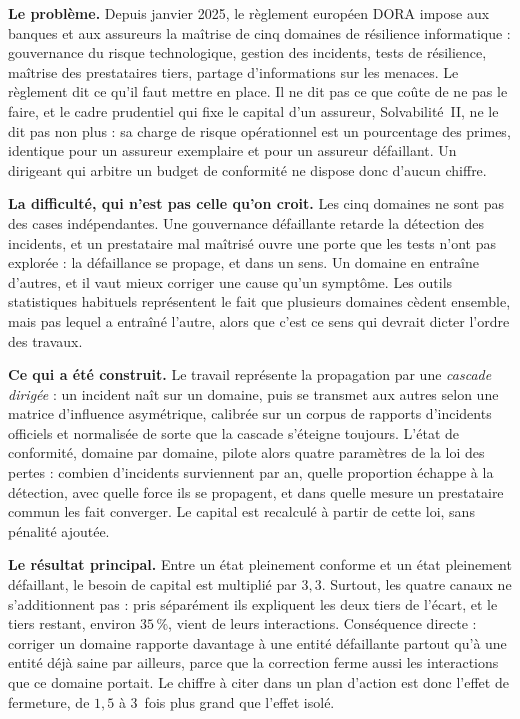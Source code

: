 \documentclass[12pt,a4paper]{article}
\theoremstyle{definition}
\begin{document}

\textbf{Le problème.} Depuis janvier 2025, le règlement européen DORA impose aux
banques et aux assureurs la maîtrise de cinq domaines de résilience informatique :
gouvernance du risque technologique, gestion des incidents, tests de résilience,
maîtrise des prestataires tiers, partage d'informations sur les menaces. Le
règlement dit ce qu'il faut mettre en place. Il ne dit pas ce que coûte de ne pas
le faire, et le cadre prudentiel qui fixe le capital d'un assureur,
Solvabilité~II, ne le dit pas non plus : sa charge de risque opérationnel est un
pourcentage des primes, identique pour un assureur exemplaire et pour un assureur
défaillant. Un dirigeant qui arbitre un budget de conformité ne dispose donc
d'aucun chiffre.

\textbf{La difficulté, qui n'est pas celle qu'on croit.} Les cinq domaines ne sont
pas des cases indépendantes. Une gouvernance défaillante retarde la détection des
incidents, et un prestataire mal maîtrisé ouvre une porte que les tests n'ont pas
explorée : la défaillance se propage, et dans un sens. Un domaine en entraîne
d'autres, et il vaut mieux corriger une cause qu'un symptôme. Les outils
statistiques habituels représentent le fait que plusieurs domaines cèdent
ensemble, mais pas lequel a entraîné l'autre, alors que c'est ce sens qui devrait
dicter l'ordre des travaux.

\textbf{Ce qui a été construit.} Le travail représente la propagation par une
\emph{cascade dirigée} : un incident naît sur un domaine, puis se transmet aux
autres selon une matrice d'influence asymétrique, calibrée sur un corpus de
rapports d'incidents officiels et normalisée de sorte que la cascade s'éteigne
toujours. L'état de conformité, domaine par domaine, pilote alors quatre
paramètres de la loi des pertes : combien d'incidents surviennent par an, quelle
proportion échappe à la détection, avec quelle force ils se propagent, et dans
quelle mesure un prestataire commun les fait converger. Le capital est recalculé à
partir de cette loi, sans pénalité ajoutée.

\textbf{Le résultat principal.} Entre un état pleinement conforme et un état
pleinement défaillant, le besoin de capital est multiplié par $3{,}3$. Surtout,
les quatre canaux ne s'additionnent pas : pris séparément ils expliquent les deux
tiers de l'écart, et le tiers restant, environ $35\,\%$, vient de leurs
interactions. Conséquence directe : corriger un domaine rapporte davantage à une
entité défaillante partout qu'à une entité déjà saine par ailleurs, parce que la
correction ferme aussi les interactions que ce domaine portait. Le chiffre à citer
dans un plan d'action est donc l'effet de fermeture, de $1{,}5$ à $3$~fois plus
grand que l'effet isolé.
\end{document}
